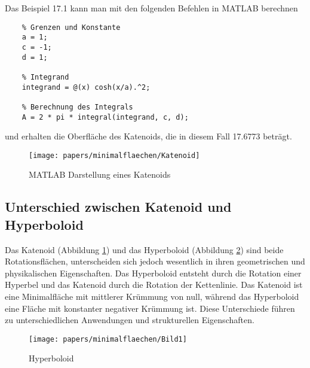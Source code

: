 Das Beispiel 17.1 kann man mit den folgenden Befehlen in MATLAB berechnen

\begin{lstlisting}
	% Grenzen und Konstante
	a = 1;
	c = -1;
	d = 1;
	
	% Integrand
	integrand = @(x) cosh(x/a).^2;
	
	% Berechnung des Integrals
	A = 2 * pi * integral(integrand, c, d);
\end{lstlisting}
%
und erhalten die Oberfläche des Katenoids, die in diesem Fall 17.6773 beträgt.


\begin{figure}
	\centering
	\texttt{[image: papers/minimalflaechen/Katenoid]}

	\caption{MATLAB Darstellung eines Katenoids}
	\label{fig:katenoid}
\end{figure}


\subsection{Unterschied zwischen Katenoid und Hyperboloid
	\label{Das Katenoid:subsection:Unterschied zwischen Katenoid und Hyperboloid}}
Das Katenoid (Abbildung \ref{fig:katenoid}) und das Hyperboloid (Abbildung \ref{fig:bild1}) sind beide Rotationsflächen, unterscheiden sich jedoch wesentlich in ihren geometrischen und physikalischen Eigenschaften.
%
Das Hyperboloid entsteht durch die Rotation einer Hyperbel und das Katenoid durch die Rotation der Kettenlinie. 
Das Katenoid ist eine Minimalfläche mit mittlerer Krümmung von null, während das Hyperboloid eine Fläche mit konstanter negativer Krümmung ist.
Diese Unterschiede führen zu unterschiedlichen Anwendungen und strukturellen Eigenschaften.
\begin{figure}
	\centering
	\texttt{[image: papers/minimalflaechen/Bild1]}
	\caption{Hyperboloid \cite{minimalflaechen:Hyperboloid}}
	\label{fig:bild1}
\end{figure}

